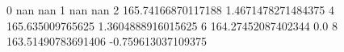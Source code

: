 0 nan nan
1 nan nan
2 165.74166870117188 1.4671478271484375
4 165.635009765625 1.3604888916015625
6 164.27452087402344 0.0
8 163.51490783691406 -0.759613037109375
